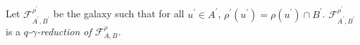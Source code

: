 \documentclass[draft]{article}
\def\lsem{{\lbrack\mid}}
\def\rsem{{\mid\rbrack}}
\begin{document}
%
%
\\
\\
%
%
Let ${\mathcal F}_{A^{\prime},B^{\prime}}^{\rho^{\prime}}$ be the galaxy such that for all $u^{\prime}{\in}A^{\prime}$, $\rho^{\prime}(u^{\prime}){=}\rho(u^{\prime}){\cap}B^{\prime}$.
${\mathcal F}_{A^{\prime},B^{\prime}}^{\rho^{\prime}}$ is a {\it $q$-$\gamma$-reduction of ${\mathcal F}_{A,B}^{\rho}$.}
%
%
%
%
%
%
%
%
\end{document}
